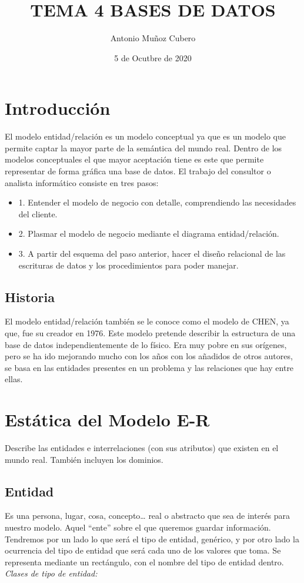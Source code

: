 \documentclass{article}
\title{TEMA 4 BASES DE DATOS}
\author{Antonio Muñoz Cubero}
\date{5 de Ocutbre de 2020}
\begin{document}
\maketitle
{}

\newpage

    \tableofcontents

\newpage
\section{Introducción}
El modelo entidad/relación es un modelo conceptual ya que es un modelo que permite captar la mayor parte de la semántica del mundo real.
Dentro de los modelos conceptuales el que mayor aceptación tiene es este que permite representar de forma gráfica una base de datos. El trabajo del 
consultor o analista informático consiste en tres pasos:
\begin{itemize}

    \item 1. Entender el modelo de negocio con detalle, comprendiendo las necesidades del cliente.
    \item 2. Plasmar el modelo de negocio mediante el diagrama entidad/relación.
    \item 3. A partir del esquema del paso anterior, hacer el diseño relacional de las escrituras de datos y los procedimientos para poder manejar.

\end{itemize}

\subsection{Historia}
El modelo entidad/relación también se le conoce como el modelo de CHEN, ya que, fue su creador en 1976. Este modelo pretende describir la estructura de 
una base de datos independientemente de lo físico. Era muy pobre en sus orígenes, pero se ha ido mejorando mucho con los años con los añadidos de otros 
autores, se basa en las entidades presentes en un problema y las relaciones que hay entre ellas.

\section{Estática del Modelo E-R}
Describe las entidades e interrelaciones (con sus atributos) que existen en el mundo real. También incluyen los dominios.

\subsection{Entidad}
Es una persona, lugar, cosa, concepto… real o abstracto que sea de interés para nuestro modelo. Aquel “ente” sobre el que queremos guardar información. 
Tendremos por un lado lo que será el tipo de entidad, genérico, y por otro lado la ocurrencia del tipo de entidad que será cada uno de los valores que toma.
Se representa mediante un rectángulo, con el nombre del tipo de entidad dentro.
\textit{Clases de tipo de entidad:}
\end{document}

